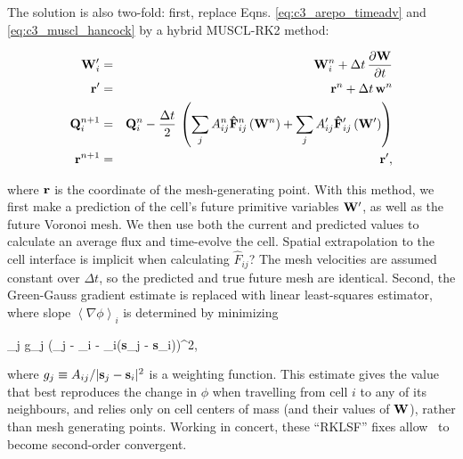 The solution is also two-fold: first, replace Eqns. \ref{eq:c3_arepo_timeadv} and \ref{eq:c3_muscl_hancock} by a hybrid MUSCL-RK2 method:

\begin{eqnarray}
{\bf W}^\prime_i &=& {\bf W}^n_i + \Delta t \, \frac{\partial {\bf W}}{\partial t} \nonumber \\
{\bf r}^\prime &=& {\bf r}^n +  \Delta t \, {\bf w}^n \nonumber \\
{\bf Q}^{n+1}_i &=& {\bf Q}^n_i - \frac{\Delta t}{2} \, \left( \sum_j A^n_{ij} {\bf \hat{F}}_{ij}^{n} \left( {\bf W}^n \right) + \sum_j A^\prime_{ij} {\bf \hat{F}}_{ij}^{\prime} \left( {\bf W}^\prime \right) \right) \nonumber \\
{\bf r}^{n+1} &=& {\bf r}^\prime,
\end{eqnarray}

\noindent where ${\bf r}$ is the coordinate of the mesh-generating point.  With this method, we first make a prediction of the cell's future primitive variables ${\bf W}^\prime$, as well as the future Voronoi mesh.  We then use both the current and predicted values to calculate an average flux and time-evolve the cell.  {\charles Spatial extrapolation to the cell interface is implicit when calculating $\hat{F}_{ij}$?}  The mesh velocities are assumed constant over $\Delta t$, so the predicted and true future mesh are identical.  Second, the Green-Gauss gradient estimate is replaced with linear least-squares estimator, where slope $\left\langle \nabla \phi \right\rangle_i$ is determined by minimizing

\eqbegin
\sum_j g_j \left(\phi_j - \phi_i - \left\langle \nabla \phi \right\rangle_i({\bf s}_j - {\bf s}_i)\right)^2,
\label{eq:c3_leastsq_grad}
\eqend

\noindent where $g_j \equiv A_{ij}/|{\bf s}_j - {\bf s}_i|^2$ is a weighting function.  This estimate gives the value that best reproduces the change in $\phi$ when travelling from cell $i$ to any of its neighbours, and relies only on cell centers of mass (and their values of ${\bf W}$), rather than mesh generating points.  Working in concert, these ``RKLSF'' fixes allow \arepo\ to become second-order convergent.

